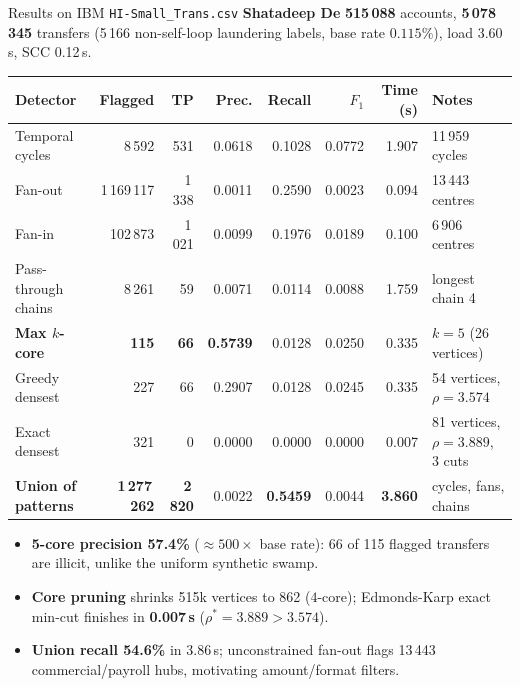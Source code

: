 \documentclass[aspectratio=169,11pt]{beamer}
\newcommand{\memberbadge}[1]{%
  \hfill{\small\bfseries\color{memberred}#1}%
}
\begin{document}
\begin{frame}{Results on IBM \texttt{HI-Small\_Trans.csv} \memberbadge{Shatadeep De}}
{\footnotesize\textbf{515\,088} accounts, \textbf{5\,078\,345} transfers (5\,166 non-self-loop laundering labels, base rate $0.115\%$), load 3.60\,s, SCC 0.12\,s.}

\vspace{0.18cm}
\centering
{\scriptsize
\setlength{\tabcolsep}{5.5pt}
\begin{tabular}{@{}lrrrrrrl@{}}
\toprule
\textbf{Detector} & \textbf{Flagged} & \textbf{TP} & \textbf{Prec.} & \textbf{Recall} & \textbf{$F_1$} & \textbf{Time (s)} & \textbf{Notes} \\
\midrule
Temporal cycles & 8\,592 & 531 & 0.0618 & 0.1028 & 0.0772 & 1.907 & 11\,959 cycles \\
Fan-out & 1\,169\,117 & 1\,338 & 0.0011 & 0.2590 & 0.0023 & 0.094 & 13\,443 centres \\
Fan-in & 102\,873 & 1\,021 & 0.0099 & 0.1976 & 0.0189 & 0.100 & 6\,906 centres \\
Pass-through chains & 8\,261 & 59 & 0.0071 & 0.0114 & 0.0088 & 1.759 & longest chain 4 \\
\textbf{Max $k$-core} & \textbf{115} & \textbf{66} & \textbf{0.5739} & 0.0128 & 0.0250 & 0.335 & $k = 5$ (26 vertices) \\
Greedy densest & 227 & 66 & 0.2907 & 0.0128 & 0.0245 & 0.335 & 54 vertices, $\rho = 3.574$ \\
Exact densest & 321 & 0 & 0.0000 & 0.0000 & 0.0000 & 0.007 & 81 vertices, $\rho = 3.889$, 3 cuts \\
\midrule
\textbf{Union of patterns} & \textbf{1\,277\,262} & \textbf{2\,820} & 0.0022 & \textbf{0.5459} & 0.0044 & \textbf{3.860} & cycles, fans, chains \\
\bottomrule
\end{tabular}
}

\vspace{0.2cm}
\raggedright
\scriptsize
\begin{itemize}
\setlength{\itemsep}{0.2em}
\item \textbf{5-core precision 57.4\%} ($\approx 500\times$ base rate): 66 of 115 flagged transfers are illicit, unlike the uniform synthetic swamp.
\item \textbf{Core pruning} shrinks 515k vertices to 862 ($4$-core); Edmonds-Karp exact min-cut finishes in \textbf{0.007\,s} ($\rho^* = 3.889 > 3.574$).
\item \textbf{Union recall 54.6\%} in 3.86\,s; unconstrained fan-out flags 13\,443 commercial/payroll hubs, motivating amount/format filters.
\end{itemize}
\end{frame}
\end{document}
